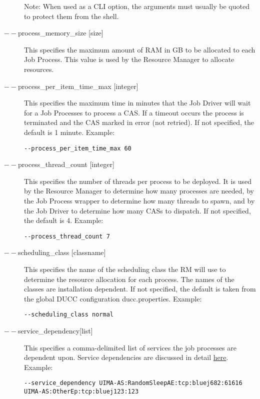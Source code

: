 \begin{description}
             Note: When used as a CLI option, the arguments must usually be
             quoted to protect them from the shell.
                          
           \item[$--$process\_memory\_size {[size]} ] This specifies the maximum amount of RAM in GB
             to be allocated to each Job Process.  This value is used by the Resource Manager to
             allocate resources.

           \item[$--$process\_per\_item\_time\_max {[integer]} ] This specifies the maximum time in
             minutes that the Job Driver will wait for a Job Processes to process a CAS. If a
             timeout occurs the process is terminated and the CAS marked in error (not retried). If
             not specified, the default is 1 minute. Example:
             \begin{verbatim}
--process_per_item_time_max 60 
             \end{verbatim}
             
           \item[$--$process\_thread\_count {[integer]} ] This specifies the number of threads per
             process to be deployed. It is used by the Resource Manager to determine how many
             processes are needed, by the Job Process wrapper to determine how many threads to
             spawn, and by the Job Driver to determine how many CASs to dispatch. If not specified,
             the default is 4. Example:
             \begin{verbatim}
--process_thread_count 7 
             \end{verbatim}
             
           \item[$--$scheduling\_class {[classname]} ] This specifies the name of the scheduling class
             the RM will use to determine the resource allocation for each process. The names of the
             classes are installation dependent. If not specified, the default is taken from the
             global DUCC configuration ducc.properties.  Example:
             \begin{verbatim}
--scheduling_class normal 
             \end{verbatim}
          

           \item[$--$service\_dependency{[list]}] This specifies a comma-delimited list of services the job
             processes are dependent upon. Service dependencies are discussed in detail
             \hyperref[sec:service.endpoints]{here}. Example:
\begin{verbatim}
--service_dependency UIMA-AS:RandomSleepAE:tcp:bluej682:61616 UIMA-AS:OtherEp:tcp:bluej123:123 
\end{verbatim}


\end{description}

